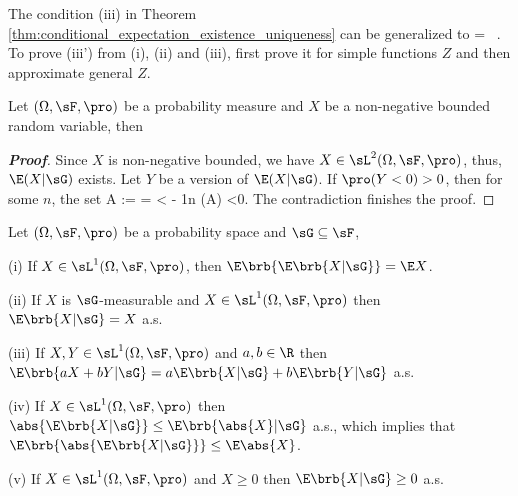 \begin{remark}
The condition (iii) in Theorem \ref{thm:conditional_expectation_existence_uniqueness} can be generalized to
\be
{}\quad \E{} = \E{}\ .
\ee
To prove (iii') from (i), (ii) and (iii), first prove it for simple functions $Z$ and then approximate general $Z$.
\end{remark}

\begin{lemma}\label{lem:non_negative_bounded_conditional_expectation}
Let $(\Omega,\sF,\pro)$ be a probability measure and $X$ be a non-negative bounded random variable, then
\be
\E{} \quad \quad {}
\ee
\end{lemma}

\begin{proof}[\bf Proof]
Since $X$ is non-negative bounded, we have $X\in \sL^2(\Omega,\sF,\pro)$, thus, $\E(X|\sG)$ exists. Let $Y$ be a version of $\E(X|\sG)$. If $\pro(Y<0) >0$, then for some $n$, the set
\be
A := \in \sG \quad{} \quad\ra {} \leq \E{} = \E{} < - \frac 1n \pro(A) <0.
\ee
The contradiction finishes the proof.
\end{proof}

\begin{proposition}\label{pro:conditional_expectation_basic_property}
Let $(\Omega,\sF,\pro)$ be a probability space and $\sG \subseteq \sF$,
\ben
\item [(i)] If $X \in \sL^1(\Omega,\sF,\pro)$, then $\E\brb{\E\brb{X |\sG}} = \E X$.
\item [(ii)] If $X$ is $\sG$-measurable and $X \in \sL^1(\Omega,\sF,\pro)$ then $\E\brb{X |\sG} = X$ a.s.
\item [(iii)] If $X, Y \in \sL^1(\Omega,\sF,\pro)$ and $a, b \in \R$ then $\E\brb{aX + bY |\sG} = a\E\brb{X |\sG}+ b\E\brb{Y | \sG}$ a.s.
\item [(iv)] If $X \in \sL^1(\Omega,\sF,\pro)$ then $\abs{\E\brb{X |\sG}} \leq \E\brb{\abs{X}|\sG}$ a.s., which implies that $\E\brb{\abs{\E\brb{X |\sG}}} \leq \E\abs{X}$.
\item [(v)] If $X \in \sL^1(\Omega,\sF,\pro)$ and $X\geq 0$ then $\E\brb{X|\sG} \geq 0$ a.s.
\een
\end{proposition}

